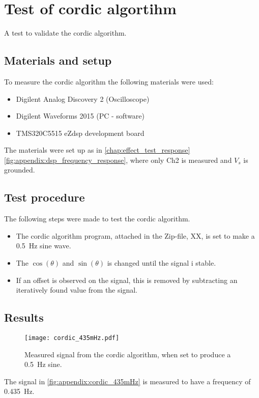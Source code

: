 \chapter{Test of \gls{cordic} algortihm}\label{app:cordic_shape}
A test to validate the \gls{cordic} algorithm.

\section*{Materials and setup}
To measure the \gls{cordic} algorithm the following materials were used:
\begin{itemize}
\item Digilent Analog Discovery 2 (Oscilloscope)
\item Digilent Waveforms 2015 (PC - software)
\item TMS320C5515 eZdsp development board
\end{itemize}

The materials were set up as in \autoref{chap:effect_test_response} \autoref{fig:appendix:dsp_frequency_response}, where only Ch2 is measured and $V_s$ is grounded.

\section*{Test procedure}
The following steps were made to test the \gls{cordic} algorithm.
\begin{itemize}
\item The \gls{cordic} algorithm program, attached in the Zip-file, XX, is set to make a \SI{0.5}{\hertz} sine wave.
\item The $\cos(\theta)$ and $\sin(\theta)$ is changed until the signal i stable.
\item If an offset is observed on the signal, this is removed by subtracting an iteratively found value from the signal.
\end{itemize} 

\section*{Results} 

\begin{figure}[htbp!]
	\centering
		\texttt{[image: cordic\_435mHz.pdf]}
		\caption{Measured signal from the \gls{cordic} algorithm, when set to produce a \SI{0.5}{\hertz} sine.}
		\label{fig:appendix:cordic_435mHz}
\end{figure}

The signal in \autoref{fig:appendix:cordic_435mHz} is measured to have a frequency of \SI{0.435}{\hertz}.